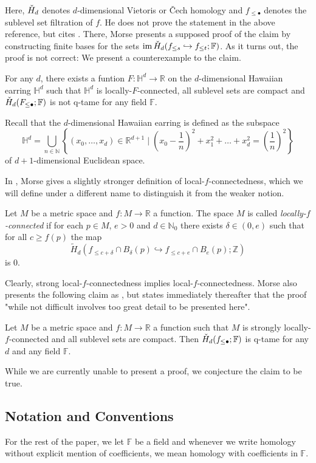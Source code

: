 Here, $\check{H}_{d}$ denotes $d$-dimensional Vietoris or \v{C}ech homology and $f_{\leq\bullet}$ denotes the sublevel set filtration of $f$. He does not prove the statement in the above reference, but cites \cite[Theorem 6.1]{Morse.1938}. There, Morse presents a supposed proof of the claim by constructing finite bases for the sets $\operatorname{im} \check{H}_d(f_{\leq s}\hookrightarrow f_{\leq t};\mathbb{F})$. As it turns out, the proof is not correct: We present a counterexample to the claim.

\begin{thm}\label{thm:counterexample}
	For any $d$, there exists a funtion $F\colon \mathbb{H}^{d}\to\mathbb{R}$ on the $d$-dimensional Hawaiian earring $\mathbb{H}^{d}$ such that $\mathbb{H}^{d}$ is locally-$F$-connected, all sublevel sets are compact and $\check{H}_d(F_{\leq\bullet};\mathbb{F})$ is not q-tame for any field $\mathbb{F}$.
\end{thm}

Recall that the $d$-dimensional Hawaiian earring is defined as the subspace
\[
\mathbb{H}^{d}=\bigcup_{n\in\mathbb{N}}\left\{(x_0,\dots,x_d)\in\mathbb{R}^{d+1}\mid \left(x_0-\frac{1}{n}\right)^2+x_1^2+\dots+x_d^2=\left(\frac{1}{n}\right)^2\right\}
\]
of $d+1$-dimensional Euclidean space.

In \cite{Morse.1937}, Morse gives a slightly stronger definition of local-$f$-connectedness, which we will define under a different name to distinguish it from the weaker notion.

\begin{defi} 
	Let $M$ be a metric space and $f\colon M\to\mathbb{R}$ a function. The space $M$ is called \emph{locally-$f$-connected} if for each $p \in M$, $e > 0$ and $d \in \mathbb{N}_0$ there exists $\delta \in (0,e)$ such that for all $c \geq f(p)$ the map 
	\[
	\tilde{H}_d(f_{\leq c+\delta} \cap B_{\delta}(p) \hookrightarrow f_{\leq c+e} \cap B_e(p); \mathbb{Z})
	\]
	is 0.
\end{defi}

Clearly, strong local-$f$-connectedness implies local-$f$-connectedness. Morse also presents the following claim as \cite[Theorem 9.2]{Morse.1937}, but states immediately thereafter that the proof "while not difficult involves too great detail to be presented here".

\begin{claim}\label{con:q-tame_pers_cech_hom}
	Let $M$ be a metric space and $f\colon M\to\mathbb{R}$ a function such that $M$ is strongly locally-$f$-connected and all sublevel sets are compact. Then $\check{H}_d(f_{\leq\bullet};\mathbb{F})$ is q-tame for any $d$ and any field $\mathbb{F}$.
\end{claim}

While we are currently unable to present a proof, we conjecture the claim to be true. 


\subsection*{Notation and Conventions}
For the rest of the paper, we let $\mathbb{F}$ be a field and whenever we write homology without explicit mention of coefficients, we mean homology with coefficients in $\mathbb{F}$.